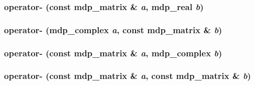 \label{classmdp__matrix_a0034bcdf68e3b07c30b406e046401937}
\hypertarget{classmdp__matrix_aa6a8885aa8604478e5e4481e1f10d700}{
\subsubsection[{operator-\/}]{ operator-\/ (const {\bf mdp\_\-matrix} \& {\em a}, \/  {\bf mdp\_\-real} {\em b})}}
\label{classmdp__matrix_aa6a8885aa8604478e5e4481e1f10d700}
\hypertarget{classmdp__matrix_a505c39c420588b8e6d1071a01509ed43}{
\subsubsection[{operator-\/}]{ operator-\/ ({\bf mdp\_\-complex} {\em a}, \/  const {\bf mdp\_\-matrix} \& {\em b})}}
\label{classmdp__matrix_a505c39c420588b8e6d1071a01509ed43}
\hypertarget{classmdp__matrix_ad5af014fcf319974b767e466ebbe0a41}{
\subsubsection[{operator-\/}]{ operator-\/ (const {\bf mdp\_\-matrix} \& {\em a}, \/  {\bf mdp\_\-complex} {\em b})}}
\label{classmdp__matrix_ad5af014fcf319974b767e466ebbe0a41}
\hypertarget{classmdp__matrix_a60f405280a02350fdc22b1b8b86712c6}{
\subsubsection[{operator-\/}]{ operator-\/ (const {\bf mdp\_\-matrix} \& {\em a}, \/  const {\bf mdp\_\-matrix} \& {\em b})}}
